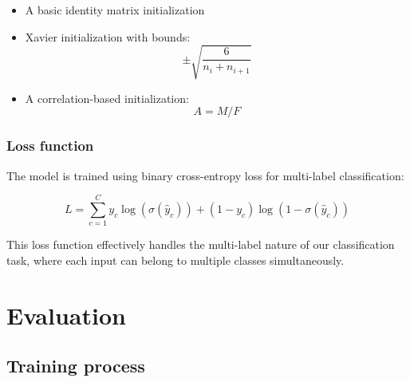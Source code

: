 \documentclass{article}
\begin{document}
\begin{itemize}
\item A basic identity matrix initialization
\item Xavier initialization with bounds:
\begin{equation}
\pm\sqrt{\frac{6}{n_i + n_{i+1}}}
\end{equation}
\item A correlation-based initialization:
\begin{equation}
A = M / F
\end{equation}
\end{itemize}

\subsubsection{Loss function}
The model is trained using binary cross-entropy loss for multi-label classification:

\begin{equation}
L = \sum_{c=1}^C y_c\log(\sigma(\hat{y}_c)) + (1-y_c)\log(1-\sigma(\hat{y}_c))
\end{equation}

This loss function effectively handles the multi-label nature of our classification task, where each input can belong to multiple classes simultaneously.
\section{Evaluation}
\subsection{Training process}
\end{document}
